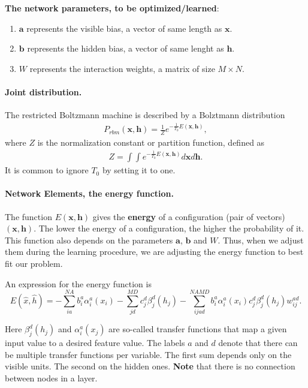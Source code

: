 \documentclass[%
oneside,                 %
final,                   %
10pt]{article}
\begin{document}
\noindent
\textbf{The network parameters, to be optimized/learned}:
\begin{enumerate}
 \item $\mathbf{a}$ represents the visible bias, a vector of same length as $\mathbf{x}$.

 \item $\mathbf{b}$ represents the hidden bias, a vector of same lenght as $\mathbf{h}$.

 \item $W$ represents the interaction weights, a matrix of size $M\times N$.
\end{enumerate}

\noindent
\paragraph{Joint distribution.}
The restricted Boltzmann machine is described by a Bolztmann distribution
\begin{align}
	P_{rbm}(\mathbf{x},\mathbf{h}) = \frac{1}{Z} e^{-\frac{1}{T_0}E(\mathbf{x},\mathbf{h})},
\end{align}
where $Z$ is the normalization constant or partition function, defined as 
\begin{align}
	Z = \int \int e^{-\frac{1}{T_0}E(\mathbf{x},\mathbf{h})} d\mathbf{x} d\mathbf{h}.
\end{align}
It is common to ignore $T_0$ by setting it to one. 


\paragraph{Network Elements, the energy function.}
The function $E(\mathbf{x},\mathbf{h})$ gives the \textbf{energy} of a
configuration (pair of vectors) $(\mathbf{x}, \mathbf{h})$. The lower
the energy of a configuration, the higher the probability of it. This
function also depends on the parameters $\mathbf{a}$, $\mathbf{b}$ and
$W$. Thus, when we adjust them during the learning procedure, we are
adjusting the energy function to best fit our problem.

An expression for the energy function is
\[
E(\hat{x},\hat{h}) = -\sum_{ia}^{NA}b_i^a \alpha_i^a(x_i)-\sum_{jd}^{MD}c_j^d \beta_j^d(h_j)-\sum_{ijad}^{NAMD}b_i^a \alpha_i^a(x_i)c_j^d \beta_j^d(h_j)w_{ij}^{ad}.
\]

Here $\beta_j^d(h_j)$ and $\alpha_i^a(x_j)$ are so-called transfer functions that map a given input value to a desired feature value. The labels $a$ and $d$ denote that there can be multiple transfer functions per variable. The first sum depends only on the visible units. The second on the hidden ones. \textbf{Note} that there is no connection between nodes in a layer.
\end{document}
